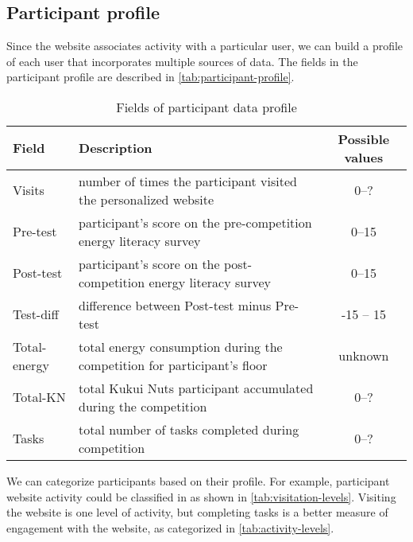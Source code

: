 \subsection{Participant profile}
\label{sec:participant-profile}

Since the website associates activity with a particular user, we can build a profile of each user that incorporates multiple sources of data. The fields in the participant profile are described in \autoref{tab:participant-profile}.

\begin{table}[htbp]
	\centering
		\begin{tabular}{| l | p{8cm} | c |}
			\hline
			Field & Description & Possible values \\ \hline
			
			Visits & number of times the participant visited the personalized website & 0--? \\ \hline
	
			Pre-test & participant's score on the pre-competition energy literacy survey & 0--15 \\ \hline

			Post-test & participant's score on the post-competition energy literacy survey & 0--15 \\ \hline
	
			Test-diff & difference between Post-test minus Pre-test & -15 -- 15 \\ \hline

			Total-energy & total energy consumption during the competition for participant's floor & unknown \\ \hline
			
			Total-KN & total Kukui Nuts participant accumulated during the competition  & 0--? \\ \hline

			Tasks & total number of tasks completed during competition & 0--? \\ \hline

		\end{tabular}
	\caption{Fields of participant data profile}
	\label{tab:participant-profile}
\end{table}

We can categorize participants based on their profile. For example, participant website activity could be classified in as shown in \autoref{tab:visitation-levels}. Visiting the website is one level of activity, but completing tasks is a better measure of engagement with the website, as categorized in \autoref{tab:activity-levels}.

